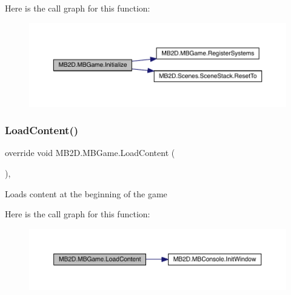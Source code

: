Here is the call graph for this function\+:\nopagebreak
\begin{figure}[H]
\begin{center}
\leavevmode
\includegraphics[width=350pt]{class_m_b2_d_1_1_m_b_game_a2157be479c1831c49301cd472cc01cde_cgraph}
\end{center}
\end{figure}
\hypertarget{class_m_b2_d_1_1_m_b_game_a64ee7de17491790b25b326a644789082}{}\label{class_m_b2_d_1_1_m_b_game_a64ee7de17491790b25b326a644789082} 
\subsubsection{\texorpdfstring{Load\+Content()}{LoadContent()}}
{\footnotesize\ttfamily override void M\+B2\+D.\+M\+B\+Game.\+Load\+Content (\begin{DoxyParamCaption}{ }\end{DoxyParamCaption})\hspace{0.3cm}{\ttfamily [inline]}, {\ttfamily [protected]}}



Loads content at the beginning of the game 

Here is the call graph for this function\+:\nopagebreak
\begin{figure}[H]
\begin{center}
\leavevmode
\includegraphics[width=350pt]{class_m_b2_d_1_1_m_b_game_a64ee7de17491790b25b326a644789082_cgraph}
\end{center}
\end{figure}
\hypertarget{class_m_b2_d_1_1_m_b_game_ad7e9a60dbaefe1416db0456b07b13487}{}\label{class_m_b2_d_1_1_m_b_game_ad7e9a60dbaefe1416db0456b07b13487} 
